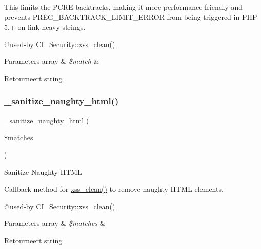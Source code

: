 This limits the P\+C\+RE backtracks, making it more performance friendly and prevents P\+R\+E\+G\+\_\+\+B\+A\+C\+K\+T\+R\+A\+C\+K\+\_\+\+L\+I\+M\+I\+T\+\_\+\+E\+R\+R\+OR from being triggered in P\+HP 5.+ on link-\/heavy strings.

@used-\/by \mbox{\hyperlink{class_c_i___security_acb759426dbab128d3d8164805225381c}{C\+I\+\_\+\+Security\+::xss\+\_\+clean()}} 
\begin{DoxyParams}[1]{Parameters}
array & {\em \$match} & \\
\hline
\end{DoxyParams}
\begin{DoxyReturn}{Retourneert}
string 
\end{DoxyReturn}
\mbox{\label{class_c_i___security_af67689597607833df370031fb799c92b}} 
\subsubsection{\texorpdfstring{\_sanitize\_naughty\_html()}{\_sanitize\_naughty\_html()}}
{\footnotesize\ttfamily \+\_\+sanitize\+\_\+naughty\+\_\+html (\begin{DoxyParamCaption}\item[{}]{\$matches }\end{DoxyParamCaption})\hspace{0.3cm}{\ttfamily [protected]}}

Sanitize Naughty H\+T\+ML

Callback method for \mbox{\hyperlink{class_c_i___security_acb759426dbab128d3d8164805225381c}{xss\+\_\+clean()}} to remove naughty H\+T\+ML elements.

@used-\/by \mbox{\hyperlink{class_c_i___security_acb759426dbab128d3d8164805225381c}{C\+I\+\_\+\+Security\+::xss\+\_\+clean()}} 
\begin{DoxyParams}[1]{Parameters}
array & {\em \$matches} & \\
\hline
\end{DoxyParams}
\begin{DoxyReturn}{Retourneert}
string 
\end{DoxyReturn}
\mbox{\label{class_c_i___security_aed66bb1c40ccc25c96326da7c0e2088a}} 
